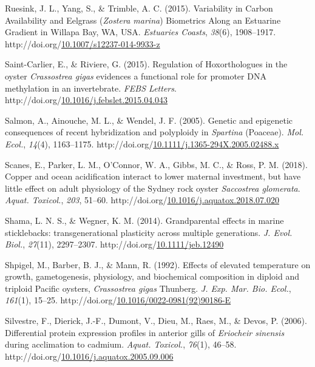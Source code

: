 \documentclass [11pt, proquest] {uwthesis}[2015/03/03]
\newlength{\cslhangindent}
\newenvironment{CSLReferences}%
{\setlength{\parindent}{0pt}%
\everypar{\setlength{\hangindent}{\cslhangindent}}\ignorespaces}%
{\par}
\begin{document}
\begin{CSLReferences}{1}{0}
\leavevmode\hypertarget{ref-Ruesink2015}{}%
Ruesink, J. L., Yang, S., \& Trimble, A. C. (2015). {Variability in Carbon Availability and Eelgrass (\emph{Zostera marina}) Biometrics Along an Estuarine Gradient in Willapa Bay, WA, USA}. \emph{Estuaries Coasts}, \emph{38}(6), 1908--1917. http://doi.org/\href{https://doi.org/10.1007/s12237-014-9933-z}{10.1007/s12237-014-9933-z}

\leavevmode\hypertarget{ref-Saint-Carlier2015}{}%
Saint-Carlier, E., \& Riviere, G. (2015). {Regulation of Hoxorthologues in the oyster \emph{Crassostrea gigas} evidences a functional role for promoter DNA methylation in an invertebrate}. \emph{FEBS Letters}. http://doi.org/\href{https://doi.org/10.1016/j.febslet.2015.04.043}{10.1016/j.febslet.2015.04.043}

\leavevmode\hypertarget{ref-Salmon2005}{}%
Salmon, A., Ainouche, M. L., \& Wendel, J. F. (2005). {Genetic and epigenetic consequences of recent hybridization and polyploidy in \emph{Spartina} (Poaceae)}. \emph{Mol. Ecol.}, \emph{14}(4), 1163--1175. http://doi.org/\href{https://doi.org/10.1111/j.1365-294X.2005.02488.x}{10.1111/j.1365-294X.2005.02488.x}

\leavevmode\hypertarget{ref-Scanes2018}{}%
Scanes, E., Parker, L. M., O'Connor, W. A., Gibbs, M. C., \& Ross, P. M. (2018). {Copper and ocean acidification interact to lower maternal investment, but have little effect on adult physiology of the Sydney rock oyster \emph{Saccostrea glomerata}}. \emph{Aquat. Toxicol.}, \emph{203}, 51--60. http://doi.org/\href{https://doi.org/10.1016/j.aquatox.2018.07.020}{10.1016/j.aquatox.2018.07.020}

\leavevmode\hypertarget{ref-Shama2014}{}%
Shama, L. N. S., \& Wegner, K. M. (2014). {Grandparental effects in marine sticklebacks: transgenerational plasticity across multiple generations}. \emph{J. Evol. Biol.}, \emph{27}(11), 2297--2307. http://doi.org/\href{https://doi.org/10.1111/jeb.12490}{10.1111/jeb.12490}

\leavevmode\hypertarget{ref-Shpigel1992}{}%
Shpigel, M., Barber, B. J., \& Mann, R. (1992). {Effects of elevated temperature on growth, gametogenesis, physiology, and biochemical composition in diploid and triploid Pacific oysters, \emph{Crassostrea gigas} Thunberg}. \emph{J. Exp. Mar. Bio. Ecol.}, \emph{161}(1), 15--25. http://doi.org/\href{https://doi.org/10.1016/0022-0981(92)90186-E}{10.1016/0022-0981(92)90186-E}

\leavevmode\hypertarget{ref-Silvestre2006}{}%
Silvestre, F., Dierick, J.-F., Dumont, V., Dieu, M., Raes, M., \& Devos, P. (2006). {Differential protein expression profiles in anterior gills of \emph{Eriocheir sinensis} during acclimation to cadmium}. \emph{Aquat. Toxicol.}, \emph{76}(1), 46--58. http://doi.org/\href{https://doi.org/10.1016/j.aquatox.2005.09.006}{10.1016/j.aquatox.2005.09.006}


\end{CSLReferences}
\end{document}
